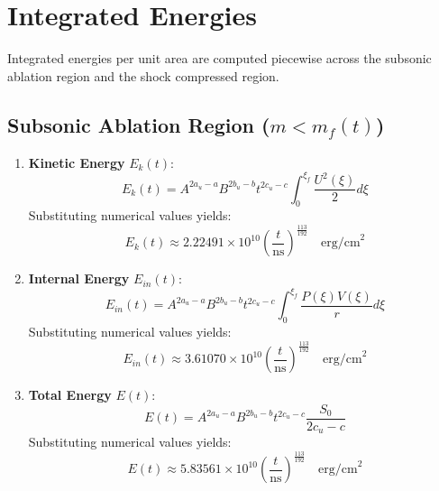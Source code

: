 \documentclass[11pt]{article}
\begin{document}
\section{Integrated Energies}
Integrated energies per unit area are computed piecewise across the subsonic ablation region and the shock compressed region.

\subsection{Subsonic Ablation Region ($m < m_f(t)$)}
\begin{enumerate}
    \item \textbf{Kinetic Energy} $E_k(t)$:
    \begin{equation}
        E_k(t) = A^{2a_u - a} B^{2b_u - b} t^{2c_u - c} \int_0^{\xi_f} \frac{U^2(\xi)}{2} d\xi
    \end{equation}
    Substituting numerical values yields:
    \begin{equation}
        E_k(t) \approx 2.22491 \times 10^{10} \left(\frac{t}{\text{ns}}\right)^{\frac{113}{192}} \quad \text{erg/cm}^2
    \end{equation}

    \item \textbf{Internal Energy} $E_{in}(t)$:
    \begin{equation}
        E_{in}(t) = A^{2a_u - a} B^{2b_u - b} t^{2c_u - c} \int_0^{\xi_f} \frac{P(\xi)V(\xi)}{r} d\xi
    \end{equation}
    Substituting numerical values yields:
    \begin{equation}
        E_{in}(t) \approx 3.61070 \times 10^{10} \left(\frac{t}{\text{ns}}\right)^{\frac{113}{192}} \quad \text{erg/cm}^2
    \end{equation}

    \item \textbf{Total Energy} $E(t)$:
    \begin{equation}
        E(t) = A^{2a_u - a} B^{2b_u - b} t^{2c_u - c} \frac{S_0}{2c_u - c}
    \end{equation}
    Substituting numerical values yields:
    \begin{equation}
        E(t) \approx 5.83561 \times 10^{10} \left(\frac{t}{\text{ns}}\right)^{\frac{113}{192}} \quad \text{erg/cm}^2
    \end{equation}
\end{enumerate}
\end{document}
